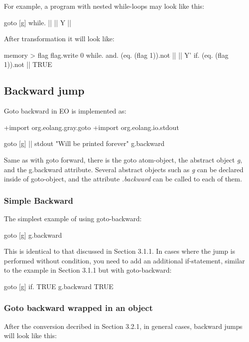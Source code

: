 \documentclass[sigplan,review,11pt,nonacm,natbib=false]{acmart}
\begin{document}
For example, a program with nested while-loops may look like this:
\begin{ffcode}
goto
  [g]
    while.
      ||
      ||
        Y
        ||
\end{ffcode}

After transformation it will look like:
\begin{ffcode}
memory > flag
flag.write 0
while.
  and.
    (eq. (flag 1)).not
    ||
  ||
    Y'
    if.
      (eq. (flag 1)).not
      ||
      TRUE
\end{ffcode}



\subsection{Backward jump}
Goto backward in EO is implemented as:

\begin{ffcode}
+import org.eolang.gray.goto
+import org.eolang.io.stdout

goto
  [g]
    ||
      stdout "Will be printed forever"
      g.backward
\end{ffcode}

Same as with goto forward, there is the goto atom-object, the abstract object \emph{g}, and the g.backward attribute. Several abstract objects such as \emph{g} can be declared inside of goto-object, and the attribute \emph{.backward} can be called to each of them.

\subsubsection{Simple Backward} The simplest example of using goto-backward:

\begin{ffcode}
goto
  [g]
    g.backward
\end{ffcode}

This is identical to that discussed in Section 3.1.1. In cases where the jump is performed without condition, you need to add an additional if-statement, similar to the example in Section 3.1.1 but with goto-backward:

\begin{ffcode}
goto
  [g]
    if.
      TRUE
      g.backward
      TRUE
\end{ffcode}

\subsubsection{Goto backward wrapped in an object}
After the conversion decribed in Section 3.2.1, in general cases, backward jumps will look like this:
\end{document}
